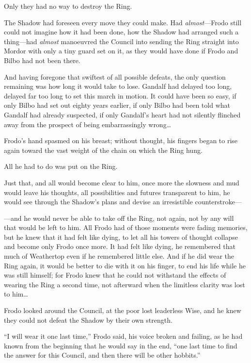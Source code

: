 Only they had no way to destroy the Ring.

The Shadow had foreseen every move they could make. Had
\emph{almost}---Frodo still could not imagine how it had been done, how
the Shadow had arranged such a thing---had \emph{almost} manoeuvred the
Council into sending the Ring straight into Mordor with only a tiny
guard set on it, as they would have done if Frodo and Bilbo had not been
there.

And having foregone that swiftest of all possible defeats, the only
question remaining was how long it would take to lose. Gandalf had
delayed too long, delayed far too long to set this march in motion. It
could have been so easy, if only Bilbo had set out eighty years earlier,
if only Bilbo had been told what Gandalf had already suspected, if only
Gandalf's heart had not silently flinched away from the prospect of
being embarrassingly wrong\ldots{}

Frodo's hand spasmed on his breast; without thought, his fingers began
to rise again toward the vast weight of the chain on which the Ring
hung.

All he had to do was put on the Ring.

Just that, and all would become clear to him, once more the slowness and
mud would leave his thoughts, all possibilities and futures transparent
to him, he would see through the Shadow's plans and devise an
irresistible counterstroke---

---and he would never be able to take off the Ring, not again, not by
any will that would be left to him. All Frodo had of those moments were
fading memories, but he knew that it had felt like dying, to let all his
towers of thought collapse and become only Frodo once more. It had felt
like dying, he remembered that much of Weathertop even if he remembered
little else. And if he did wear the Ring again, it would be better to
die with it on his finger, to end his life while he was still himself;
for Frodo knew that he could not withstand the effects of wearing the
Ring a second time, not afterward when the limitless clarity was lost to
him\ldots{}

Frodo looked around the Council, at the poor lost leaderless Wise, and
he knew they could not defeat the Shadow by their own strength.

``I will wear it one last time,'' Frodo said, his voice broken and
failing, as he had known from the beginning that he would say in the
end, ``one last time to find the answer for this Council, and then there
will be other hobbits.''

